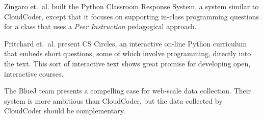 \documentclass{sig-alternate}
\begin{document}

Zingaro et.\ al. built the Python Classroom Response
System\cite{Zingaro:2013:FCP:2445196.2445369}, a system similar to
CloudCoder, except that it focuses on supporting in-class programming
questions for a class that uses a {\em Peer Instruction} pedagogical approach.

Pritchard et.\ al. present CS Circles\cite{Pritchard:2013:CCI:2445196.2445370},
an interactive on-line
Python curriculum that embeds short questions, some of which involve
programming, directly into the text.  This sort of interactive text
shows great promise for developing open, interactive courses.

The BlueJ team presents a compelling case for web-scale data
collection\cite{Utting:2012:WDG:2361276.2361278}.  Their system is
more ambitious than CloudCoder, but the data collected by CloudCoder
should be complementary.
\end{document}
